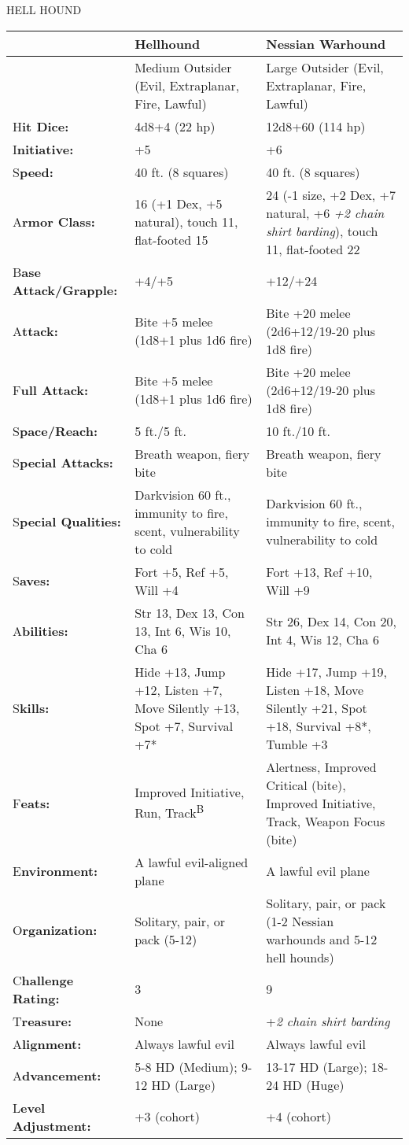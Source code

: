 \documentclass{article}
\begin{document}
\vspace{12pt}
{\LARGE{}HELL HOUND}

\begin{tabular}{|>{\raggedright}p{47pt}|>{\raggedright}p{133pt}|>{\raggedright}p{133pt}|}
\hline
 & H\textbf{ellhound} & N\textbf{essian Warhound}\tabularnewline
\hline
  & Medium Outsider (Evil, Extraplanar, Fire, Lawful) & Large Outsider (Evil, Extraplanar, 
Fire, Lawful)\tabularnewline
\hline
H\textbf{it Dice:} & 4d8+4 (22 hp) & 12d8+60 (114 hp)\tabularnewline
\hline
I\textbf{nitiative:} & +5 & +6\tabularnewline
\hline
S\textbf{peed:} & 40 ft. (8 squares) & 40 ft. (8 squares)\tabularnewline
\hline
A\textbf{rmor Class:} & 16 (+1 Dex, +5 natural), touch 11, flat-footed 15 & 24 
(-1 size, +2 Dex, +7 natural, +6 \textit{+2 chain shirt barding}), touch 11, flat-footed 
22\tabularnewline
\hline
B\textbf{ase Attack/Grapple:} & +4/+5 & +12/+24\tabularnewline
\hline
A\textbf{ttack:} & Bite +5 melee (1d8+1 plus 1d6 fire) & Bite +20 melee (2d6+12/19-20 
plus 1d8 fire)\tabularnewline
\hline
F\textbf{ull Attack:} & Bite +5 melee (1d8+1 plus 1d6 fire) & Bite +20 melee (2d6+12/19-20 
plus 1d8 fire)\tabularnewline
\hline
S\textbf{pace/Reach:} & 5 ft./5 ft. & 10 ft./10 ft.\tabularnewline
\hline
S\textbf{pecial Attacks:} & Breath weapon, fiery bite & Breath weapon, fiery bite\tabularnewline
\hline
S\textbf{pecial Qualities:} & Darkvision 60 ft., immunity to fire, scent, vulnerability 
to cold & Darkvision 60 ft., immunity to fire, scent, vulnerability to cold\tabularnewline
\hline
S\textbf{aves:} & Fort +5, Ref +5, Will +4 & Fort +13, Ref +10, Will +9\tabularnewline
\hline
A\textbf{bilities:} & Str 13, Dex 13, Con 13, Int 6, Wis 10, Cha 6 & Str 26, Dex 
14, Con 20, Int 4, Wis 12, Cha 6\tabularnewline
\hline
S\textbf{kills:} & Hide +13, Jump +12, Listen +7, Move Silently +13, Spot +7, Survival 
+7* & Hide +17, Jump +19, Listen +18, Move Silently +21, Spot +18, Survival +8*, 
Tumble +3\tabularnewline
\hline
F\textbf{eats:} & Improved Initiative, Run, Track\textsuperscript{B} & Alertness, 
Improved Critical (bite), Improved Initiative, Track, Weapon Focus (bite)\tabularnewline
\hline
E\textbf{nvironment:} & A lawful evil-aligned plane & A lawful evil plane\tabularnewline
\hline
O\textbf{rganization:} & Solitary, pair, or pack (5-12) & Solitary, pair, or pack 
(1-2 Nessian warhounds and 5-12 hell hounds)\tabularnewline
\hline
C{\small{}\textbf{hallenge Rating:}} & 3 & 9\tabularnewline
\hline
T\textbf{reasure:} & None & +\textit{2 chain shirt barding}\tabularnewline
\hline
A\textbf{lignment:} & Always lawful evil & Always lawful evil\tabularnewline
\hline
A\textbf{dvancement:} & 5-8 HD (Medium); 9-12 HD (Large) & 13-17 HD (Large); 18-24 
HD (Huge)\tabularnewline
\hline
L\textbf{evel Adjustment:} & +3 (cohort) & +4 (cohort)\tabularnewline
\hline
\end{tabular}
\end{document}
